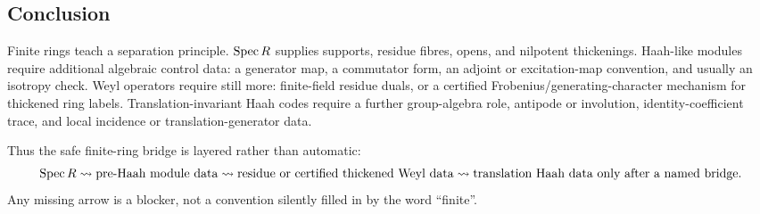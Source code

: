 \subsection{Conclusion}

Finite rings teach a separation principle.  \(\operatorname{Spec} R\) supplies supports,
residue fibres, opens, and nilpotent thickenings.  Haah-like modules require
additional algebraic control data: a generator map, a commutator form, an
adjoint or excitation-map convention, and usually an isotropy check.  Weyl
operators require still more: finite-field residue duals, or a certified
Frobenius/generating-character mechanism for thickened ring labels.
Translation-invariant Haah codes require a further group-algebra role,
antipode or involution, identity-coefficient trace, and local incidence or
translation-generator data.

Thus the safe finite-ring bridge is layered rather than automatic:
\[
  \operatorname{Spec} R
  \leadsto
  \text{pre-Haah module data}
  \leadsto
  \text{residue or certified thickened Weyl data}
  \leadsto
  \text{translation Haah data only after a named bridge}.
\]
Any missing arrow is a blocker, not a convention silently filled in by the
word ``finite''.
